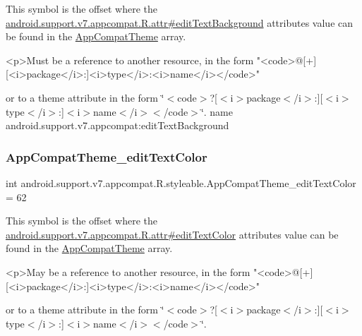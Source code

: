 This symbol is the offset where the \hyperlink{classandroid_1_1support_1_1v7_1_1appcompat_1_1R_1_1attr_a12d7ef83c1530a4fd506091342cbf601}{android.\+support.\+v7.\+appcompat.\+R.\+attr\#edit\+Text\+Background} attribute\textquotesingle{}s value can be found in the \hyperlink{classandroid_1_1support_1_1v7_1_1appcompat_1_1R_1_1styleable_a5c42f89e8a410c323be34208d75c430b}{App\+Compat\+Theme} array.

\begin{DoxyVerb}      <p>Must be a reference to another resource, in the form "<code>@[+][<i>package</i>:]<i>type</i>:<i>name</i></code>"
\end{DoxyVerb}
 or to a theme attribute in the form \char`\"{}$<$code$>$?\mbox{[}$<$i$>$package$<$/i$>$\+:\mbox{]}\mbox{[}$<$i$>$type$<$/i$>$\+:\mbox{]}$<$i$>$name$<$/i$>$$<$/code$>$\char`\"{}.  name android.\+support.\+v7.\+appcompat\+:edit\+Text\+Background \mbox{\label{classandroid_1_1support_1_1v7_1_1appcompat_1_1R_1_1styleable_a1e1c82a944abb501f53097bce7f50f0b}} 
\subsubsection{\texorpdfstring{App\+Compat\+Theme\+\_\+edit\+Text\+Color}{AppCompatTheme\_editTextColor}}
{\footnotesize\ttfamily int android.\+support.\+v7.\+appcompat.\+R.\+styleable.\+App\+Compat\+Theme\+\_\+edit\+Text\+Color = 62\hspace{0.3cm}{\ttfamily [static]}}

This symbol is the offset where the \hyperlink{classandroid_1_1support_1_1v7_1_1appcompat_1_1R_1_1attr_ae11656aa9c64037231331f234774b280}{android.\+support.\+v7.\+appcompat.\+R.\+attr\#edit\+Text\+Color} attribute\textquotesingle{}s value can be found in the \hyperlink{classandroid_1_1support_1_1v7_1_1appcompat_1_1R_1_1styleable_a5c42f89e8a410c323be34208d75c430b}{App\+Compat\+Theme} array.

\begin{DoxyVerb}      <p>May be a reference to another resource, in the form "<code>@[+][<i>package</i>:]<i>type</i>:<i>name</i></code>"
\end{DoxyVerb}
 or to a theme attribute in the form \char`\"{}$<$code$>$?\mbox{[}$<$i$>$package$<$/i$>$\+:\mbox{]}\mbox{[}$<$i$>$type$<$/i$>$\+:\mbox{]}$<$i$>$name$<$/i$>$$<$/code$>$\char`\"{}. 

